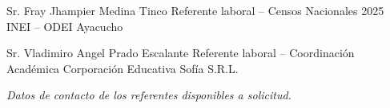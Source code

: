 \begin{referees}
	{Sr. Fray Jhampier Medina Tinco}
	{Referente laboral -- Censos Nacionales 2025}
	{INEI -- ODEI Ayacucho}

	{Sr. Vladimiro Angel Prado Escalante}
	{Referente laboral -- Coordinación Académica}
	{Corporación Educativa Sofía S.R.L.}

	
\end{referees}

\noindent\emph{Datos de contacto de los referentes disponibles a solicitud.}
